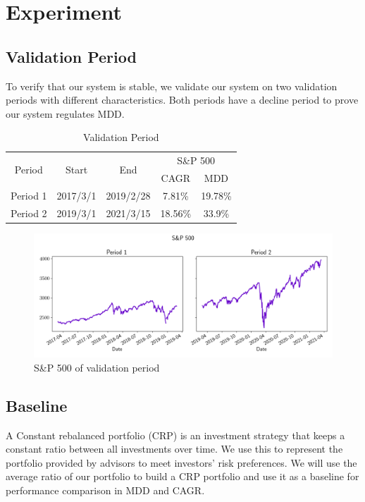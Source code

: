 \section{Experiment}
\subsection{Validation Period}
To verify that our system is stable, we validate our system on two validation periods with different characteristics.  Both periods have a decline period to prove our system regulates MDD.
\begin{table}[htb]
    \centering
    \begin{tabular}{|c|c|c|c|c|}
    \hline
    \multirow{2}{*}{Period} &
    \multirow{2}{*}{Start} &
    \multirow{2}{*}{End} &
    \multicolumn{2}{c|}{S\&P 500} \\ 
    \cline{4-5} &{} &{} & CAGR & MDD \\ \hline
    Period 1 & 2017/3/1 & 2019/2/28 & 7.81\% & 19.78\% \\ \hline
    Period 2 & 2019/3/1 & 2021/3/15 & 18.56\% & 33.9\% \\    
    \hline
    \end{tabular}
    \caption{Validation Period}
    \label{tab:validation_period}
\end{table}
\begin{figure}
    \centering
    \includegraphics[width=15cm]{images/sp500.png}
    \caption{S\&P 500 of validation period}
    \label{fig:my_label}
\end{figure}



\subsection{Baseline}
A Constant rebalanced portfolio (CRP) is an investment strategy that keeps a constant ratio between all investments over time. We use this to represent the portfolio provided by advisors to meet investors' risk preferences. We will use the average ratio of our portfolio to build a CRP portfolio and use it as a baseline for performance comparison in MDD and CAGR.
